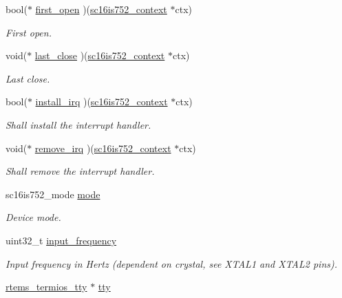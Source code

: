 \begin{DoxyCompactItemize}
bool($\ast$ \mbox{\hyperlink{structsc16is752__context_ae8e4d6e9f480559f9771e408aa1334ef}{first\+\_\+open}} )(\mbox{\hyperlink{structsc16is752__context}{sc16is752\+\_\+context}} $\ast$ctx)
\begin{DoxyCompactList}\small\item\em First open. \end{DoxyCompactList}\item 
void($\ast$ \mbox{\hyperlink{structsc16is752__context_a857f5b36a05a5c6b303bd40df0af3968}{last\+\_\+close}} )(\mbox{\hyperlink{structsc16is752__context}{sc16is752\+\_\+context}} $\ast$ctx)
\begin{DoxyCompactList}\small\item\em Last close. \end{DoxyCompactList}\item 
bool($\ast$ \mbox{\hyperlink{structsc16is752__context_adc361b215759553713977a11db263203}{install\+\_\+irq}} )(\mbox{\hyperlink{structsc16is752__context}{sc16is752\+\_\+context}} $\ast$ctx)
\begin{DoxyCompactList}\small\item\em Shall install the interrupt handler. \end{DoxyCompactList}\item 
void($\ast$ \mbox{\hyperlink{structsc16is752__context_aa3fad3393152614991abdf937f984141}{remove\+\_\+irq}} )(\mbox{\hyperlink{structsc16is752__context}{sc16is752\+\_\+context}} $\ast$ctx)
\begin{DoxyCompactList}\small\item\em Shall remove the interrupt handler. \end{DoxyCompactList}\item 
sc16is752\+\_\+mode \mbox{\hyperlink{structsc16is752__context_add412f350fe7dda7fd90ceccb712623e}{mode}}
\begin{DoxyCompactList}\small\item\em Device mode. \end{DoxyCompactList}\item 
uint32\+\_\+t \mbox{\hyperlink{structsc16is752__context_a4576615a32e41a3a28c450ed8b74de69}{input\+\_\+frequency}}
\begin{DoxyCompactList}\small\item\em Input frequency in Hertz (dependent on crystal, see X\+T\+A\+L1 and X\+T\+A\+L2 pins). \end{DoxyCompactList}\item 
\mbox{\hyperlink{structrtems__termios__tty}{rtems\+\_\+termios\+\_\+tty}} $\ast$ \mbox{\hyperlink{structsc16is752__context_a609fc83b2964e1975cdbc76079605a98}{tty}}

\end{DoxyCompactItemize}

